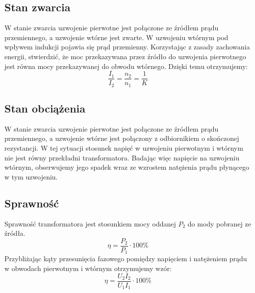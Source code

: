 \documentclass[a4paper, 11pt]{article}
\begin{document}
\subsection{Stan zwarcia}
W stanie zwarcia uzwojenie pierwotne jest połączone ze źródłem prądu przemiennego, a uzwojenie wtórne jest zwarte.
W uzwojeniu wtórnym pod wpływem indukcji pojawia się prąd przemienny.
Korzystając z zasady zachowania energii, stwierdzić,
że moc przekazywana przez źródło do uzwojenia pierwotnego jest równa mocy przekazywanej do
obwodu wtórnego.
Dzięki temu otrzymujemy:
\begin{equation}
	\frac{I_1}{I_2} = \frac{n_2}{n_1} = \frac{1}{K}
\end{equation}


\subsection{Stan obciążenia}
W stanie zwarcia uzwojenie pierwotne jest połączone ze źródłem prądu przemiennego, a uzwojenie wtórne jest połączony z odbiornikiem o skończonej rezystancji.
W tej sytuacji
stosunek napięć w uzwojeniu pierwotnym i wtórnym nie jest równy przekładni transformatora.
Badając więc napięcie na uzwojeniu wtórnym, obserwujemy jego spadek
wraz ze wzrostem natężenia prądu płynącego w tym uzwojeniu.

\subsection{Sprawność}
Sprawność transformatora jest stosunkiem mocy oddanej $P_2$ do mody pobranej ze źródła.
\begin{equation}
	\eta = \frac{P_2}{P_1} \cdot 100\%
\end{equation}
Przybliżając kąty przesunięcia fazowego pomiędzy napięciem i natężeniem prądu w obwodach
pierwotnym i wtórnym otrzymujemy wzór:
\begin{equation}
	\eta = \frac{U_2I_2}{U_1I_1} \cdot 100\%
\end{equation}

\end{document}
